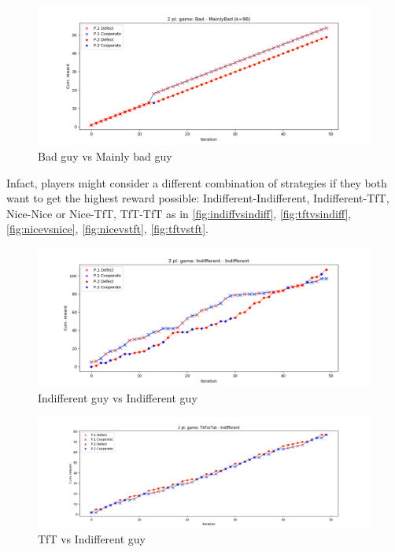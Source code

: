 \documentclass[journal,a4paper,10pt,twoside,draft]{IEEEtran}
\begin{document}
\begin{figure}
    \centering
    \includegraphics[width=1\columnwidth]{../img_v1/idp2p-rewards-Bad-MainlyBad (k=98).png}
    \caption{Bad guy vs Mainly bad guy}
    \label{fig:badvsmainlybad}
\end{figure}

Infact, players might consider a different combination of strategies if they both want to get the highest reward possible: Indifferent-Indifferent, Indifferent-TfT, Nice-Nice or Nice-TfT, TfT-TfT as in \autoref{fig:indiffvsindiff}, \autoref{fig:tftvsindiff}, \autoref{fig:nicevsnice}, \autoref{fig:nicevstft}, \autoref{fig:tftvstft}.

\begin{figure}
    \centering
    \includegraphics[width=1\columnwidth]{../img_v1/idp2p-rewards-Indifferent-Indifferent.png}
    \caption{Indifferent guy vs Indifferent guy}
    \label{fig:indiffvsindiff}
\end{figure}

\begin{figure}
    \centering
    \includegraphics[width=1\columnwidth]{../img_v1/idp2p-rewards-TitForTat-Indifferent.png}
    \caption{TfT vs Indifferent guy}
    \label{fig:tftvsindiff}
\end{figure}
\end{document}
